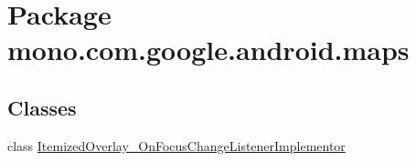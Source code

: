 \hypertarget{namespacemono_1_1com_1_1google_1_1android_1_1maps}{\section{Package mono.\+com.\+google.\+android.\+maps}
\label{namespacemono_1_1com_1_1google_1_1android_1_1maps}
}
\subsection*{Classes}
\begin{DoxyCompactItemize}
\item 
class \hyperlink{classmono_1_1com_1_1google_1_1android_1_1maps_1_1_itemized_overlay___on_focus_change_listener_implementor}{Itemized\+Overlay\+\_\+\+On\+Focus\+Change\+Listener\+Implementor}
\end{DoxyCompactItemize}
